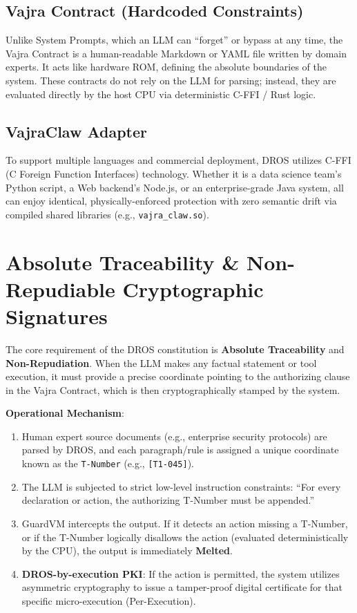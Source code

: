 \documentclass[conference]{IEEEtran}
\begin{document}
\subsection{Vajra Contract (Hardcoded Constraints)}
Unlike System Prompts, which an LLM can ``forget'' or bypass at any time, the Vajra Contract is a human-readable Markdown or YAML file written by domain experts. It acts like hardware ROM, defining the absolute boundaries of the system. These contracts do not rely on the LLM for parsing; instead, they are evaluated directly by the host CPU via deterministic C-FFI / Rust logic.

\subsection{VajraClaw Adapter}
To support multiple languages and commercial deployment, DROS utilizes C-FFI (C Foreign Function Interfaces) technology. Whether it is a data science team's Python script, a Web backend's Node.js, or an enterprise-grade Java system, all can enjoy identical, physically-enforced protection with zero semantic drift via compiled shared libraries (e.g., \texttt{vajra\_claw.so}).

\section{Absolute Traceability \& Non-Repudiable Cryptographic Signatures}
The core requirement of the DROS constitution is \textbf{Absolute Traceability} and \textbf{Non-Repudiation}. When the LLM makes any factual statement or tool execution, it must provide a precise coordinate pointing to the authorizing clause in the Vajra Contract, which is then cryptographically stamped by the system.

\textbf{Operational Mechanism}:
\begin{enumerate}
    \item Human expert source documents (e.g., enterprise security protocols) are parsed by DROS, and each paragraph/rule is assigned a unique coordinate known as the \texttt{T-Number} (e.g., \texttt{[T1-045]}).
    \item The LLM is subjected to strict low-level instruction constraints: ``For every declaration or action, the authorizing T-Number must be appended.''
    \item GuardVM intercepts the output. If it detects an action missing a T-Number, or if the T-Number logically disallows the action (evaluated deterministically by the CPU), the output is immediately \textbf{Melted}.
    \item \textbf{DROS-by-execution PKI}: If the action is permitted, the system utilizes asymmetric cryptography to issue a tamper-proof digital certificate for that specific micro-execution (Per-Execution).
\end{enumerate}
\end{document}
